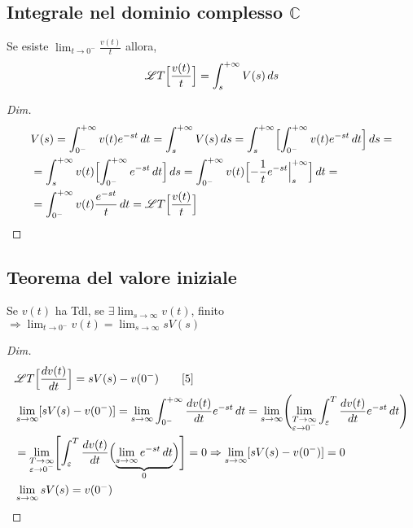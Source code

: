 \subsection{Integrale nel dominio complesso $\mathbb{C}$}
Se esiste $\lim_{t\to 0^-}\frac{v(t)}{t}$ allora,
\[
   \mathscr{L}T\Bigl[\frac{v(t)}{t}\Bigr] = \int_s^{+\infty}V(s)\,ds
\]
\begin{proof}[Dim]
   \[
      \begin{split}
         & V(s) = \intZeroInfinity v(t)e^{-st}\,dt= \int_s^{+\infty}V(s)\,ds = \int_s^{+\infty}\Bigl[\intZeroInfinity v(t)e^{-st}\,dt\Bigr]\,ds = \\
         & = \int_s^{+\infty}v(t)\Bigl[\intZeroInfinity e^{-st}\,dt\Bigr]\,ds = \intZeroInfinity v(t)\Bigl[-\frac{1}{t}e^{-st}\Big|_s^{+\infty}\Bigr]\,dt = \\ %
         & = \intZeroInfinity v(t)\frac{e^{-st}}{t}\,dt = \LA\Bigl[\frac{v(t)}{t}\Bigr]
      \end{split}
   \]
\end{proof}
\subsection{Teorema del valore iniziale}
Se $v(t)$ ha Tdl, se $\exists \lim_{s\to \infty}v(t)$, finito $\Rightarrow \lim_{t\to 0^-}v(t) = \lim_{s\to \infty}sV(s)$
\begin{proof}[Dim]
   \[
      \begin{split}
         & \mathscr{L}T\Bigl[\frac{dv(t)}{dt}\Bigr] = sV(s) - v(0^-)\qquad [5]\\
         & \lim_{s\to \infty}[sV(s) - v(0^-)] = \lim_{s\to \infty}\int_{0^-}^{+\infty}\frac{dv(t)}{dt}e^{-st}\,dt = \lim_{s\to \infty} \Biggl(\lim_{\substack{T\to \infty \\ \varepsilon\to 0^-}}\int_\varepsilon^T\frac{dv(t)}{dt}e^{-st}\,dt\Biggr) \\
         & = \lim_{\substack{T\to \infty \\ \varepsilon\to 0^-}}\Biggl[\int_\varepsilon^T\frac{dv(t)}{dt}\Bigl(\underbrace{\lim_{s\to \infty}e^{-st}\,dt}_0\Bigr)\Biggr] = 0 \Rightarrow \lim_{s\to \infty}[sV(s) - v(0^-)] = 0 \\
         & \lim_{s\to \infty}sV(s) = v(0^-)
      \end{split}
   \]
\end{proof}
